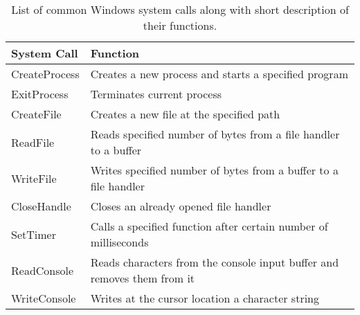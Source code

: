 \documentclass[a4,11pt]{article}
\begin{document}
\begin{table}[!h]
  \centering
  \label{table:windows-syscalls}
  \caption{List of common Windows system calls along with short
    description of their functions.}
  \vspace{0.2cm}
  \begin{tabular}{||l | p{}||} 
    \hline

    \textbf{System Call} & \textbf{Function} \\ [0.5ex] 

    \hline\hline

    CreateProcess & Creates a new process and starts a specified program \\
    
    \hline ExitProcess & Terminates current process \\

    \hline CreateFile & Creates a new file at the specified path \\

    \hline ReadFile & Reads specified number of bytes from a file
                      handler to a buffer \\

    \hline WriteFile & Writes specified number of bytes from a buffer
                       to a file handler \\

    \hline CloseHandle & Closes an already opened file handler \\

    \hline SetTimer & Calls a specified function after certain number of milliseconds \\

    \hline ReadConsole & Reads characters from the console input buffer and removes them from it\\

    \hline WriteConsole & Writes at the cursor location a character string \\

    \hline
  \end{tabular}

\end{table}
\end{document}
